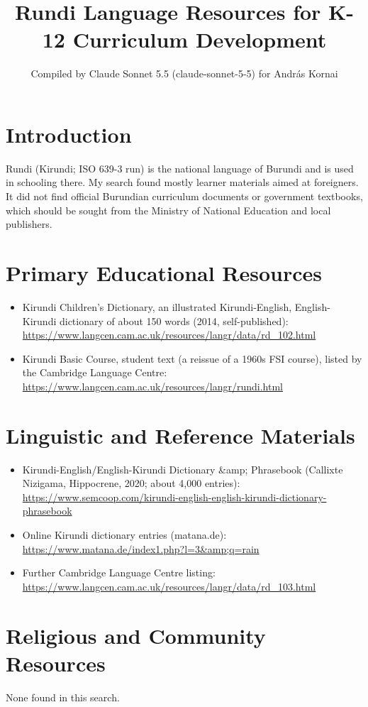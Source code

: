 \documentclass[12pt]{article}
\title{Rundi Language Resources for K-12 Curriculum Development}
\author{Compiled by Claude Sonnet 5.5 (claude-sonnet-5-5) for Andr\'as Kornai}
\date{}
\begin{document}
\maketitle

\section{Introduction}
Rundi (Kirundi; ISO 639-3 run) is the national language of Burundi and is used in schooling there. My search found mostly learner materials aimed at foreigners. It did not find official Burundian curriculum documents or government textbooks, which should be sought from the Ministry of National Education and local publishers.

\section{Primary Educational Resources}
\begin{itemize}
\item Kirundi Children's Dictionary, an illustrated Kirundi-English, English-Kirundi dictionary of about 150 words (2014, self-published): \url{https://www.langcen.cam.ac.uk/resources/langr/data/rd_102.html}
\item Kirundi Basic Course, student text (a reissue of a 1960s FSI course), listed by the Cambridge Language Centre: \url{https://www.langcen.cam.ac.uk/resources/langr/rundi.html}
\end{itemize}

\section{Linguistic and Reference Materials}
\begin{itemize}
\item Kirundi-English/English-Kirundi Dictionary \&amp; Phrasebook (Callixte Nizigama, Hippocrene, 2020; about 4,000 entries): \url{https://www.semcoop.com/kirundi-english-english-kirundi-dictionary-phrasebook}
\item Online Kirundi dictionary entries (matana.de): \url{https://www.matana.de/index1.php?l=3&amp;q=rain}
\item Further Cambridge Language Centre listing: \url{https://www.langcen.cam.ac.uk/resources/langr/data/rd_103.html}
\end{itemize}

\section{Religious and Community Resources}
None found in this search.
\end{document}
